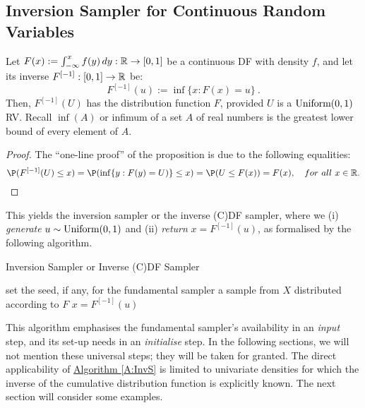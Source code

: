 \subsection{Inversion Sampler for Continuous Random Variables}\label{S:InvS}
\begin{prop}\label{P:InvS}
Let $F(x) := \int_{- \infty}^{x} f(y) \,d y : \mathbb{R} \rightarrow [0,1]$ be a continuous DF with density $f$, and let its inverse $F^{[-1]} : [0,1] \rightarrow \mathbb{R} $ be:
\[
F^{[-1]}(u) :=  \inf \{ x :  F(x) = u \} \ .
\]
Then, $F^{[-1]}(U)$ has the distribution function $F$, provided $U$ is a $\mbox{{\rm Uniform}}(0,1)$ RV.  Recall $\inf(A)$ or infimum of a set $A$ of real numbers is the greatest lower bound of every element of $A$.
\end{prop}
\begin{proof}
The ``one-line proof'' of the proposition is due to the following equalities:
\[
\P(F^{[-1]}(U) \leq x) = \P(\inf \{ y :  F(y) = U)\} \leq x ) = \P(U \leq F(x)) = F(x), \quad for~all~x \in \Rz .
\]
\end{proof}

This yields the inversion sampler or the inverse (C)DF sampler, where we (i) {\it generate} $u \sim \mbox{{\rm Uniform}}(0,1)$ and (ii) {\it return} $x = F^{[-1]}(u)$, as formalised by the following algorithm.

\begin{algorithm}
\caption{Inversion Sampler or Inverse (C)DF Sampler}
\label{A:InvS}
\begin{algorithmic}[1]
 set the seed, if any, for the fundamental sampler
 a sample from $X$ distributed according to $F$
 $x = F^{[-1]}(u)$
\end{algorithmic}
\end{algorithm}
This algorithm emphasises the fundamental sampler's availability in an {\it input} step, and its set-up needs in an {\it initialise} step.  In the following sections, we will not mention these universal steps; they will be taken for granted.  The direct applicability of \hyperref[A:InvS]{Algorithm \ref*{A:InvS}} is limited to univariate densities for which the inverse of the cumulative distribution function is explicitly known.  The next section will consider some examples.


